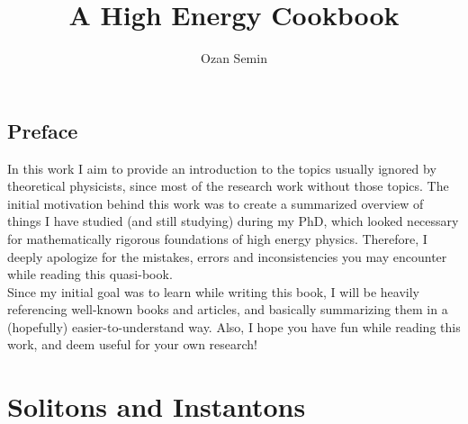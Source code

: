\documentclass[14pt,openany,a4paper]{memoir}
\author{Ozan Semin}
\title{A High Energy Cookbook}
\begin{document}
\maketitle
\frontmatter

\tableofcontents

\chapter{Preface}
In this work I aim to provide an introduction to the topics usually ignored by theoretical physicists, since most of the research work without those topics. The initial motivation behind this work was to create a summarized overview of things I have studied (and still studying) during my PhD, which looked necessary for mathematically rigorous foundations of high energy physics. Therefore, I deeply apologize for the mistakes, errors and inconsistencies you may encounter while reading this quasi-book. 
\\
Since my initial goal was to learn while writing this book, I will be heavily referencing well-known books and articles, and basically summarizing them in a (hopefully) easier-to-understand way. Also, I hope you have fun while reading this work, and deem useful for your own research! 

\mainmatter

\part{Solitons and Instantons}




\end{document}
